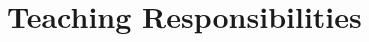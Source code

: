 \documentclass[10pt,a4paper,sans]{moderncv} %
\begin{document}
{%










\needspace{6em}%
\section{\textbf{Teaching Responsibilities}}

}
\end{document}
